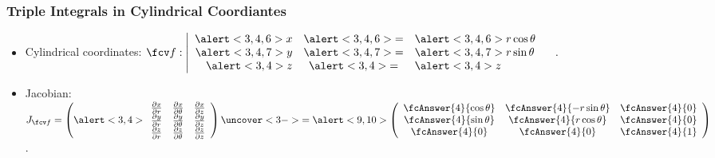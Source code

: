 \begin{frame}
\frametitle{Triple Integrals in Cylindrical Coordiantes}
\begin{itemize}
\item Cylindrical coordinates: 
$
\fcv f:\left|
\begin{array}{rcl}
\alert<3,4,6>{x}&\alert<3,4,6>{=}&\alert<3,4,6>{r\cos \theta} \\
\alert<3,4,7>{y}&\alert<3,4,7>{=}&\alert<3,4,7>{r\sin \theta}\\
\alert<3,4>{z}&\alert<3,4>{=}& \alert<3,4>{z}
\end{array}
\right. \quad .
$
\item<2-> Jacobian: 
$
J_{\fcv f} = \left(\alert<3,4>{ \begin{array}{ccc} 
\frac{\partial x}{\partial r}& \frac{\partial x}{\partial \theta} & \frac{\partial x}{\partial z} \\ 
\frac{\partial y}{\partial r}& \frac{\partial y}{\partial \theta}& \frac{\partial y}{\partial z}\\ 
\frac{\partial z}{\partial r}& \frac{\partial z}{\partial \theta}& \frac{\partial z}{\partial z}\\ 
\end{array} }\right) \uncover<3->{= \alert<9,10>{\left( \begin{array}{ccc} 
\fcAnswer{4}{\cos \theta } & \fcAnswer{4}{-r\sin\theta} &\fcAnswer{4}{0}\\ 
\fcAnswer{4}{\sin \theta} & \fcAnswer{4}{r\cos\theta}&\fcAnswer{4}{0}\\
\fcAnswer{4}{0} & \fcAnswer{4}{0} &\fcAnswer{4}{1}
\end{array} \right)}}$.
\end{itemize}
\end{frame}